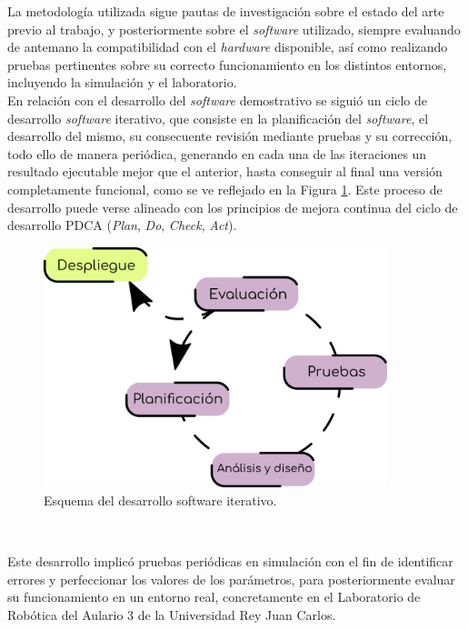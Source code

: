 La metodología utilizada sigue pautas de investigación sobre el estado del arte
previo al trabajo, y posteriormente sobre el \textit{software} utilizado,
siempre evaluando de antemano la compatibilidad con el \textit{hardware}
disponible, así como realizando pruebas pertinentes sobre su correcto
funcionamiento en los distintos entornos, incluyendo la simulación y el
laboratorio.
\\

En relación con el desarrollo del \textit{software} demostrativo se siguió un
ciclo de desarrollo \textit{software} iterativo, que consiste en la
planificación del \textit{software}, el desarrollo del mismo, su consecuente
revisión mediante pruebas y su corrección, todo ello de manera periódica,
generando en cada una de las iteraciones un resultado ejecutable mejor que el
anterior, hasta conseguir al final una versión completamente funcional, como se
ve reflejado en la Figura \ref{fig:desarrollo_iterativo}.
Este proceso de desarrollo puede verse alineado con los principios de mejora
continua del ciclo de desarrollo PDCA (\textit{Plan}, \textit{Do},
\textit{Check}, \textit{Act}).
\\

\begin{figure} [h!]
  \begin{center}
    \includegraphics[width=10cm]{figs/desarrollo_iterativo}
  \end{center}
  \caption{Esquema del desarrollo software iterativo.}
  \label{fig:desarrollo_iterativo}
\end{figure}\

Este desarrollo implicó pruebas periódicas en simulación con el fin de
identificar errores y perfeccionar los valores de los parámetros, para
posteriormente evaluar su funcionamiento en un entorno real, concretamente en el
Laboratorio de Robótica del Aulario 3 de la Universidad Rey Juan Carlos.

